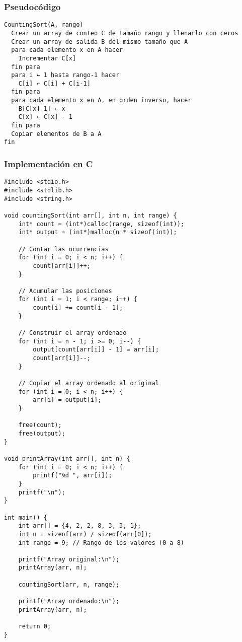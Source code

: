 \documentclass[11pt,openany]{book}
\begin{document}
\subsubsection{Pseudocódigo}
\begin{verbatim}
CountingSort(A, rango)
  Crear un array de conteo C de tamaño rango y llenarlo con ceros
  Crear un array de salida B del mismo tamaño que A
  para cada elemento x en A hacer
    Incrementar C[x]
  fin para
  para i ← 1 hasta rango-1 hacer
    C[i] ← C[i] + C[i-1]
  fin para
  para cada elemento x en A, en orden inverso, hacer
    B[C[x]-1] ← x
    C[x] ← C[x] - 1
  fin para
  Copiar elementos de B a A
fin
\end{verbatim}


\subsubsection{Implementación en C}
\lstset{language=C}
\begin{lstlisting}
#include <stdio.h>
#include <stdlib.h>
#include <string.h>

void countingSort(int arr[], int n, int range) {
    int* count = (int*)calloc(range, sizeof(int));
    int* output = (int*)malloc(n * sizeof(int));

    // Contar las ocurrencias
    for (int i = 0; i < n; i++) {
        count[arr[i]]++;
    }

    // Acumular las posiciones
    for (int i = 1; i < range; i++) {
        count[i] += count[i - 1];
    }

    // Construir el array ordenado
    for (int i = n - 1; i >= 0; i--) {
        output[count[arr[i]] - 1] = arr[i];
        count[arr[i]]--;
    }

    // Copiar el array ordenado al original
    for (int i = 0; i < n; i++) {
        arr[i] = output[i];
    }

    free(count);
    free(output);
}

void printArray(int arr[], int n) {
    for (int i = 0; i < n; i++) {
        printf("%d ", arr[i]);
    }
    printf("\n");
}

int main() {
    int arr[] = {4, 2, 2, 8, 3, 3, 1};
    int n = sizeof(arr) / sizeof(arr[0]);
    int range = 9; // Rango de los valores (0 a 8)

    printf("Array original:\n");
    printArray(arr, n);

    countingSort(arr, n, range);

    printf("Array ordenado:\n");
    printArray(arr, n);

    return 0;
}
\end{lstlisting}
\end{document}
